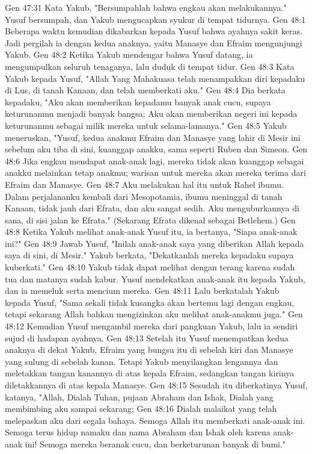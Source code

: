 Gen 47:31  Kata Yakub, "Bersumpahlah bahwa engkau akan melakukannya." Yusuf bersumpah, dan Yakub mengucapkan syukur di tempat tidurnya.
Gen 48:1  Beberapa waktu kemudian dikabarkan kepada Yusuf bahwa ayahnya sakit keras. Jadi pergilah ia dengan kedua anaknya, yaitu Manasye dan Efraim mengunjungi Yakub.
Gen 48:2  Ketika Yakub mendengar bahwa Yusuf datang, ia mengumpulkan seluruh tenaganya, lalu duduk di tempat tidur.
Gen 48:3  Kata Yakub kepada Yusuf, "Allah Yang Mahakuasa telah menampakkan diri kepadaku di Lus, di tanah Kanaan, dan telah memberkati aku."
Gen 48:4  Dia berkata kepadaku, "Aku akan memberikan kepadamu banyak anak cucu, supaya keturunanmu menjadi banyak bangsa; Aku akan memberikan negeri ini kepada keturunanmu sebagai milik mereka untuk selama-lamanya."
Gen 48:5  Yakub meneruskan, "Yusuf, kedua anakmu Efraim dan Manasye yang lahir di Mesir ini sebelum aku tiba di sini, kuanggap anakku, sama seperti Ruben dan Simeon.
Gen 48:6  Jika engkau mendapat anak-anak lagi, mereka tidak akan kuanggap sebagai anakku melainkan tetap anakmu; warisan untuk mereka akan mereka terima dari Efraim dan Manasye.
Gen 48:7  Aku melakukan hal itu untuk Rahel ibumu. Dalam perjalananku kembali dari Mesopotamia, ibumu meninggal di tanah Kanaan, tidak jauh dari Efrata, dan aku sangat sedih. Aku menguburkannya di sana, di sisi jalan ke Efrata." (Sekarang Efrata dikenal sebagai Betlehem.)
Gen 48:8  Ketika Yakub melihat anak-anak Yusuf itu, ia bertanya, "Siapa anak-anak ini?"
Gen 48:9  Jawab Yusuf, "Inilah anak-anak saya yang diberikan Allah kepada saya di sini, di Mesir." Yakub berkata, "Dekatkanlah mereka kepadaku supaya kuberkati."
Gen 48:10  Yakub tidak dapat melihat dengan terang karena sudah tua dan matanya sudah kabur. Yusuf mendekatkan anak-anak itu kepada Yakub, dan ia memeluk serta mencium mereka.
Gen 48:11  Lalu berkatalah Yakub kepada Yusuf, "Sama sekali tidak kusangka akan bertemu lagi dengan engkau, tetapi sekarang Allah bahkan mengizinkan aku melihat anak-anakmu juga."
Gen 48:12  Kemudian Yusuf mengambil mereka dari pangkuan Yakub, lalu ia sendiri sujud di hadapan ayahnya.
Gen 48:13  Setelah itu Yusuf menempatkan kedua anaknya di dekat Yakub, Efraim yang bungsu itu di sebelah kiri dan Manasye yang sulung di sebelah kanan. Tetapi Yakub menyilangkan lengannya dan meletakkan tangan kanannya di atas kepala Efraim, sedangkan tangan kirinya diletakkannya di atas kepala Manasye.
Gen 48:15  Sesudah itu diberkatinya Yusuf, katanya, "Allah, Dialah Tuhan, pujaan Abraham dan Ishak, Dialah yang membimbing aku sampai sekarang;
Gen 48:16  Dialah malaikat yang telah melepaskan aku dari segala bahaya. Semoga Allah itu memberkati anak-anak ini. Semoga terus hidup namaku dan nama Abraham dan Ishak oleh karena anak-anak ini! Semoga mereka beranak cucu, dan berketurunan banyak di bumi."
